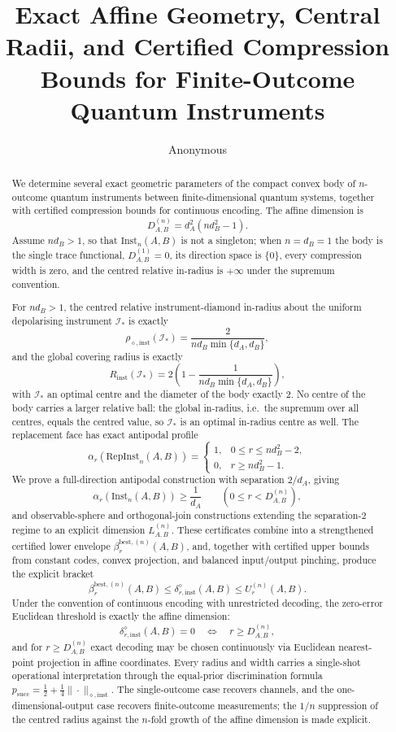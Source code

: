 \documentclass[11pt,a4paper]{article}
\title{\bfseries Exact Affine Geometry, Central Radii, and Certified Compression Bounds for Finite-Outcome Quantum Instruments}
\author{Anonymous}
\date{}
\newcommand{\Inst}{\mathrm{Inst}}
\newcommand{\RepInst}{\mathrm{RepInst}}
\begin{document}
\maketitle

\begin{abstract}
We determine several exact geometric parameters of the compact convex body of $n$-outcome quantum instruments between finite-dimensional quantum systems, together with certified compression bounds for continuous encoding. The affine dimension is
\[
D_{A,B}^{(n)}=d_A^2(nd_B^2-1).
\]
Assume $n d_B>1$, so that $\Inst_n(A,B)$ is not a singleton; when $n=d_B=1$ the body is the single trace functional, $D_{A,B}^{(1)}=0$, its direction space is $\{0\}$, every compression width is zero, and the centred relative in-radius is $+\infty$ under the supremum convention.

For $n d_B>1$, the centred relative instrument-diamond in-radius about the uniform depolarising instrument $\mathcal I_*$ is exactly
\[
\rho_{\diamond,\mathrm{inst}}(\mathcal I_*)
=\frac{2}{n d_B\min\{d_A,d_B\}},
\]
and the global covering radius is exactly
\[
R_{\mathrm{inst}}(\mathcal I_*)
=2\left(1-\frac{1}{n d_B\min\{d_A,d_B\}}\right),
\]
with $\mathcal I_*$ an optimal centre and the diameter of the body exactly $2$. No centre of the body carries a larger relative ball: the global in-radius, i.e.\ the supremum over all centres, equals the centred value, so $\mathcal I_*$ is an optimal in-radius centre as well. The replacement face has exact antipodal profile
\[
\alpha_r(\RepInst_n(A,B))=
\begin{cases}
1,&0\le r\le n d_B^2-2,\\
0,&r\ge n d_B^2-1.
\end{cases}
\]
We prove a full-direction antipodal construction with separation $2/d_A$, giving
\[
\alpha_r(\Inst_n(A,B))\ge \frac1{d_A}
\qquad(0\le r<D_{A,B}^{(n)}),
\]
and observable-sphere and orthogonal-join constructions extending the separation-$2$ regime to an explicit dimension $L_{A,B}^{(n)}$. These certificates combine into a strengthened certified lower envelope $\beta_r^{\mathrm{best},(n)}(A,B)$, and, together with certified upper bounds from constant codes, convex projection, and balanced input/output pinching, produce the explicit bracket
\[
\beta_r^{\mathrm{best},(n)}(A,B)
\le
\delta_{r,\mathrm{inst}}^{\diamond}(A,B)
\le
U_r^{(n)}(A,B).
\]
Under the convention of continuous encoding with unrestricted decoding, the zero-error Euclidean threshold is exactly the affine dimension:
\[
\delta_{r,\mathrm{inst}}^{\diamond}(A,B)=0
\quad\Longleftrightarrow\quad
r\ge D_{A,B}^{(n)},
\]
and for $r\ge D_{A,B}^{(n)}$ exact decoding may be chosen continuously via Euclidean nearest-point projection in affine coordinates. Every radius and width carries a single-shot operational interpretation through the equal-prior discrimination formula $p_{\mathrm{succ}}=\tfrac12+\tfrac14\|\cdot\|_{\diamond,\mathrm{inst}}$. The single-outcome case recovers channels, and the one-dimensional-output case recovers finite-outcome measurements; the $1/n$ suppression of the centred radius against the $n$-fold growth of the affine dimension is made explicit.
\end{abstract}
\end{document}
